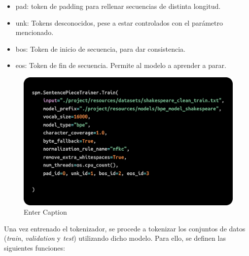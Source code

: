 \documentclass[11pt]{book}
\begin{document}
 \begin{itemize}
     \item pad: token de padding para rellenar secuencias de distinta longitud.
     \item unk: Tokens desconocidos, pese a estar controlados con el parámetro mencionado.
     \item bos: Token de inicio de secuencia, para dar consistencia.
     \item eos: Token de fin de secuencia. Permite al modelo a aprender a parar.
 \end{itemize}
\begin{figure}[h]
    \centering
    \includegraphics[width=0.5\linewidth]{img/sentence_trainer.png}
    \caption{Enter Caption}
    \label{fig:placeholder3}
\end{figure}
 
Una vez entrenado el tokenizador, se procede a tokenizar los conjuntos de datos (\textit{train}, \textit{validation} y \textit{test}) utilizando dicho modelo. Para ello, se definen las siguientes funciones:
\end{document}
